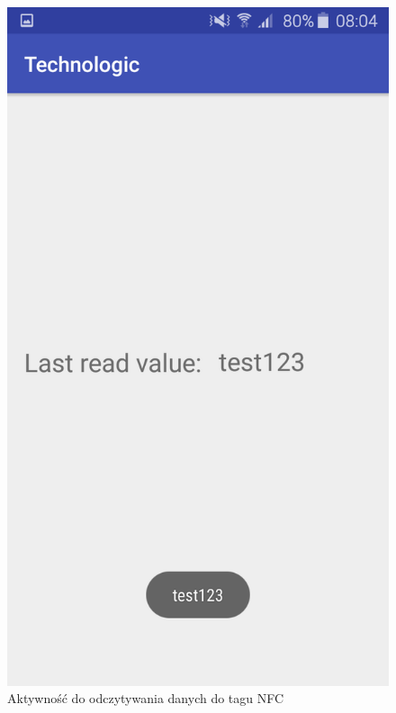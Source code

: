 \begin{figure}[H]
    \centering
    \includegraphics[scale=0.22]{imgs/read.png}
    \caption{Aktywność do odczytywania danych do tagu NFC}
\end{figure}
